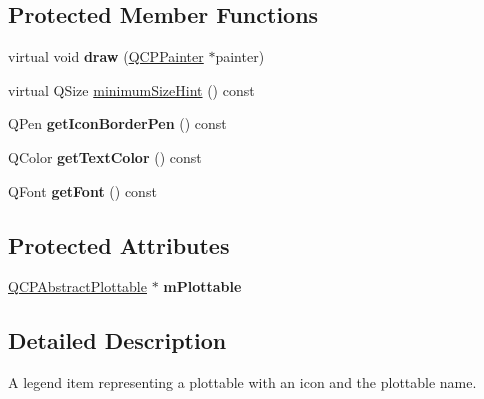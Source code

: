 \subsection*{\-Protected \-Member \-Functions}
\begin{DoxyCompactItemize}
\item 
\hypertarget{classQCPPlottableLegendItem_a68a781c3de4f9959fdf82075052d43aa}{virtual void {\bfseries draw} (\hyperlink{classQCPPainter}{\-Q\-C\-P\-Painter} $\ast$painter)}\label{classQCPPlottableLegendItem_a68a781c3de4f9959fdf82075052d43aa}

\item 
virtual \-Q\-Size \hyperlink{classQCPPlottableLegendItem_a76bad654ebc8e870392f488419a6a483}{minimum\-Size\-Hint} () const 
\item 
\hypertarget{classQCPPlottableLegendItem_ab36270e6b022a6961fa44136f35c0e4b}{\-Q\-Pen {\bfseries get\-Icon\-Border\-Pen} () const }\label{classQCPPlottableLegendItem_ab36270e6b022a6961fa44136f35c0e4b}

\item 
\hypertarget{classQCPPlottableLegendItem_ad762b07439c738660ba93e78c1d03667}{\-Q\-Color {\bfseries get\-Text\-Color} () const }\label{classQCPPlottableLegendItem_ad762b07439c738660ba93e78c1d03667}

\item 
\hypertarget{classQCPPlottableLegendItem_a8a85c8a25affb4895423d730164d61de}{\-Q\-Font {\bfseries get\-Font} () const }\label{classQCPPlottableLegendItem_a8a85c8a25affb4895423d730164d61de}

\end{DoxyCompactItemize}
\subsection*{\-Protected \-Attributes}
\begin{DoxyCompactItemize}
\item 
\hypertarget{classQCPPlottableLegendItem_ada647fb4b22971a1a424e15b4f6af0d9}{\hyperlink{classQCPAbstractPlottable}{\-Q\-C\-P\-Abstract\-Plottable} $\ast$ {\bfseries m\-Plottable}}\label{classQCPPlottableLegendItem_ada647fb4b22971a1a424e15b4f6af0d9}

\end{DoxyCompactItemize}


\subsection{\-Detailed \-Description}
\-A legend item representing a plottable with an icon and the plottable name. 

